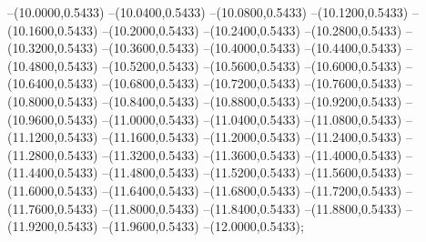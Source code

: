 {	--(10.0000,0.5433)
	--(10.0400,0.5433)
	--(10.0800,0.5433)
	--(10.1200,0.5433)
	--(10.1600,0.5433)
	--(10.2000,0.5433)
	--(10.2400,0.5433)
	--(10.2800,0.5433)
	--(10.3200,0.5433)
	--(10.3600,0.5433)
	--(10.4000,0.5433)
	--(10.4400,0.5433)
	--(10.4800,0.5433)
	--(10.5200,0.5433)
	--(10.5600,0.5433)
	--(10.6000,0.5433)
	--(10.6400,0.5433)
	--(10.6800,0.5433)
	--(10.7200,0.5433)
	--(10.7600,0.5433)
	--(10.8000,0.5433)
	--(10.8400,0.5433)
	--(10.8800,0.5433)
	--(10.9200,0.5433)
	--(10.9600,0.5433)
	--(11.0000,0.5433)
	--(11.0400,0.5433)
	--(11.0800,0.5433)
	--(11.1200,0.5433)
	--(11.1600,0.5433)
	--(11.2000,0.5433)
	--(11.2400,0.5433)
	--(11.2800,0.5433)
	--(11.3200,0.5433)
	--(11.3600,0.5433)
	--(11.4000,0.5433)
	--(11.4400,0.5433)
	--(11.4800,0.5433)
	--(11.5200,0.5433)
	--(11.5600,0.5433)
	--(11.6000,0.5433)
	--(11.6400,0.5433)
	--(11.6800,0.5433)
	--(11.7200,0.5433)
	--(11.7600,0.5433)
	--(11.8000,0.5433)
	--(11.8400,0.5433)
	--(11.8800,0.5433)
	--(11.9200,0.5433)
	--(11.9600,0.5433)
	--(12.0000,0.5433);
}
